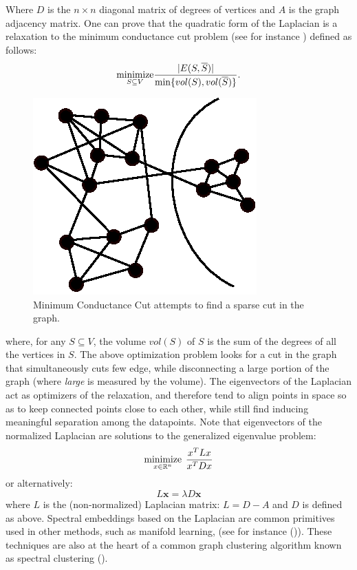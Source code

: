 Where $D$ is the $n \times n$ diagonal matrix of degrees of vertices and $A$ is the graph adjacency matrix. One can prove that the quadratic form of the Laplacian is a relaxation to the minimum conductance cut problem (see for instance \cite{chung1997spectral}) defined as follows:
\[
    \underset{S  \subseteq V }{\text{minimize}} {|E(S,\overline{S})|\over \min\{vol(S), vol(\overline{S})\}}.
\]
\begin{figure}[H]
\centering
\includegraphics[scale=0.75]{figures/conductance.eps}
\caption{Minimum Conductance Cut attempts to find a sparse cut in the graph.}
\end{figure}
where, for any $S \subseteq V$, the volume $vol(S)$ of $S$ is the sum of the degrees of all the vertices in $S$. The above optimization problem looks for a cut in the graph that simultaneously cuts few edge, while disconnecting a large portion of the graph (where \emph{large} is measured by the volume). The eigenvectors of the Laplacian act as optimizers of the relaxation, and therefore tend to align points in space so as to keep connected points close to each other, while still find inducing meaningful separation among the datapoints. Note that eigenvectors of the normalized Laplacian are solutions to the generalized eigenvalue problem:
\[
    \underset{x \in \mathbb{R}^n}{\text{minimize}}\hspace{1.5mm}{x^TLx \over x^TDx}
\]
or alternatively:
\[
    L\mathbf{x} = \lambda D\mathbf{x}
\]
where $L$ is the (non-normalized) Laplacian matrix: $L = D-A$ and $D$ is defined as above. Spectral embeddings based on the Laplacian are common primitives used in other methods, such as manifold learning, (see for instance (\cite{belkin2003laplacian})). These techniques are also at the heart of a common graph clustering algorithm known as spectral clustering (\cite{ng2002spectral}).
